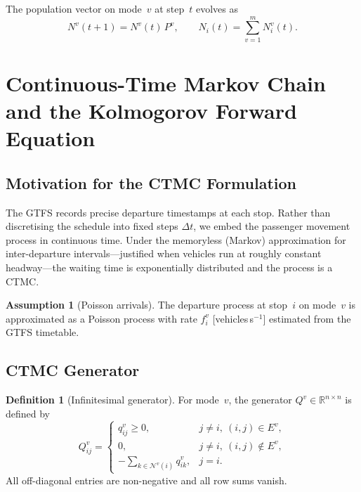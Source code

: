 \documentclass[11pt,a4paper]{article}
\theoremstyle{plain}
\theoremstyle{definition}
\newtheorem{definition}[theorem]{Definition}
\newtheorem{assumption}[theorem]{Assumption}
\theoremstyle{remark}
\begin{document}
The population vector on mode~$v$ at step~$t$ evolves as
\begin{equation}
  N^v(t+1) = N^v(t)\,P^v,\qquad N_i(t)=\sum_{v=1}^m N^v_i(t).
\end{equation}

\section{Continuous-Time Markov Chain and the Kolmogorov Forward Equation}
\label{sec:ctmc}

\subsection{Motivation for the CTMC Formulation}

The GTFS records precise departure timestamps at each stop.  Rather than
discretising the schedule into fixed steps $\Delta t$, we embed the passenger
movement process in continuous time.  Under the memoryless (Markov)
approximation for inter-departure intervals---justified when vehicles run at
roughly constant headway---the waiting time is exponentially distributed and the
process is a CTMC.

\begin{assumption}[Poisson arrivals]
\label{ass:poisson}
The departure process at stop~$i$ on mode~$v$ is approximated as a Poisson
process with rate $f^v_i$ [vehicles\,s$^{-1}$] estimated from the GTFS
timetable.
\end{assumption}

\subsection{CTMC Generator}

\begin{definition}[Infinitesimal generator]
For mode~$v$, the generator $Q^v\in\mathbb{R}^{n\times n}$ is defined by
\begin{equation}
  Q^v_{ij} = \begin{cases}
    q^v_{ij}\ge0, & j\ne i,\ (i,j)\in E^v, \\
    0,             & j\ne i,\ (i,j)\notin E^v, \\
    -\displaystyle\sum_{k\in\mathcal{N}^v(i)} q^v_{ik}, & j=i.
  \end{cases}
\end{equation}
All off-diagonal entries are non-negative and all row sums vanish.
\end{definition}
\end{document}
